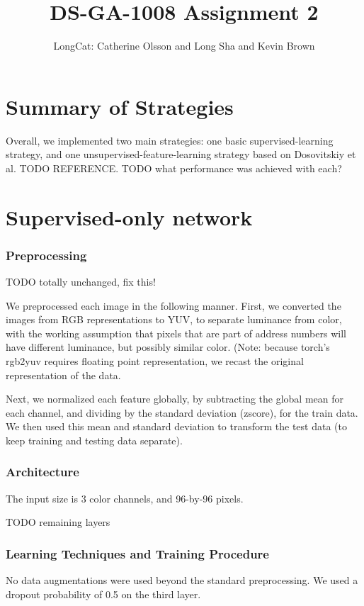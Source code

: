 \documentclass{article}
\title{DS-GA-1008 Assignment 2}
\author{LongCat: Catherine Olsson and Long Sha and Kevin Brown}
\begin{document}
 \maketitle

\section*{Summary of Strategies}

Overall, we implemented two main strategies: one basic supervised-learning strategy, and one unsupervised-feature-learning strategy based on Dosovitskiy et al. TODO REFERENCE. TODO what performance was achieved with each?

\section{Supervised-only network}

\subsubsection*{Preprocessing}

TODO totally unchanged, fix this!

We preprocessed each image in the following manner. First, we converted the
images from RGB representations to YUV, to separate luminance from color, with
the working assumption that pixels that are part of address numbers will have
different luminance, but possibly similar color. (Note: because torch's rgb2yuv
requires floating point representation, we recast the original representation of the data.

Next, we normalized each feature globally, by subtracting the global mean for
each channel, and dividing by the standard deviation (zscore), for the train
data. We then used this mean and standard deviation to transform the test data
(to keep training and testing data separate).

\subsubsection*{Architecture}

The input size is 3 color channels, and 96-by-96 pixels. 

TODO remaining layers

\subsubsection*{Learning Techniques and Training Procedure}
No data augmentations were used beyond the standard preprocessing. We used a dropout probability of 0.5 on the third layer.
\end{document}
